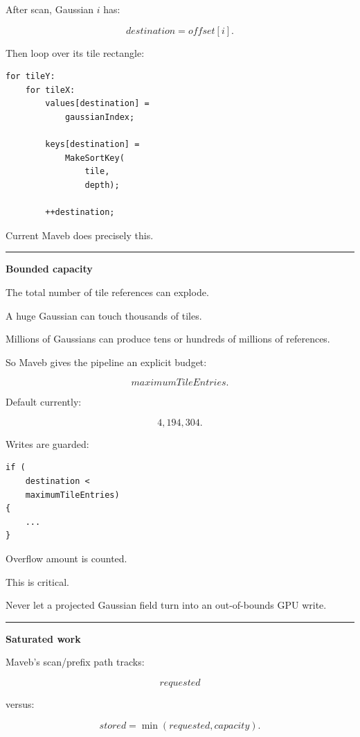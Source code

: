 After scan, Gaussian \(i\) has:

\[
destination=offset[i].
\]

Then loop over its tile rectangle:

\protect{}\label{4hi99e}%
\begin{verbatim}
for tileY:
    for tileX:
        values[destination] =
            gaussianIndex;

        keys[destination] =
            MakeSortKey(
                tile,
                depth);

        ++destination;
\end{verbatim}

Current Maveb does precisely this.

\begin{center}\rule{0.5\linewidth}{0.5pt}\end{center}

\textbf{Bounded capacity}

The total number of tile references can explode.

A huge Gaussian can touch thousands of tiles.

Millions of Gaussians can produce tens or hundreds of millions of references.

So Maveb gives the pipeline an explicit budget:

\[
maximumTileEntries.
\]

Default currently:

\[
4,194,304.
\]

Writes are guarded:

\begin{verbatim}
if (
    destination <
    maximumTileEntries)
{
    ...
}
\end{verbatim}

Overflow amount is counted.

This is critical.

Never let a projected Gaussian field turn into an out-of-bounds GPU write.

\begin{center}\rule{0.5\linewidth}{0.5pt}\end{center}

\textbf{Saturated work}

Maveb's scan/prefix path tracks:

\[
requested
\]

versus:

\[
stored=
\min(requested,capacity).
\]

